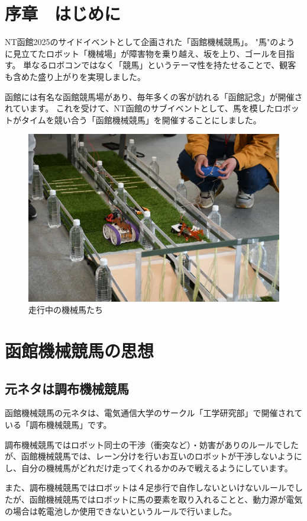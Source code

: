 \chapter{序章　はじめに}
NT函館2025のサイドイベントとして企画された「函館機械競馬」。  
"馬"のように見立てたロボット「機械場」が障害物を乗り越え、坂を上り、ゴールを目指す。  
単なるロボコンではなく「競馬」というテーマ性を持たせることで、観客も含めた盛り上がりを実現しました。

函館には有名な函館競馬場があり、毎年多くの客が訪れる「函館記念」が開催されています。  
これを受けて、NT函館のサブイベントとして、馬を模したロボットがタイムを競い合う「函館機械競馬」を開催することにしました。

\begin{figure}[h]
\centering
\includegraphics[width=0.7\linewidth]{pages/images/course.png}
\caption{走行中の機械馬たち}
\end{figure}

\chapter{函館機械競馬の思想}
\section{元ネタは調布機械競馬}
函館機械競馬の元ネタは、電気通信大学のサークル「工学研究部」で開催されている「調布機械競馬」です。

調布機械競馬ではロボット同士の干渉（衝突など）・妨害がありのルールでしたが、函館機械競馬では、レーン分けを行いお互いのロボットが干渉しないようにし、自分の機械馬がどれだけ走ってくれるかのみで戦えるようにしています。

また、調布機械競馬ではロボットは４足歩行で自作しないといけないルールでしたが、函館機械競馬ではロボットに馬の要素を取り入れることと、動力源が電気の場合は乾電池しか使用できないというルールで行いました。

